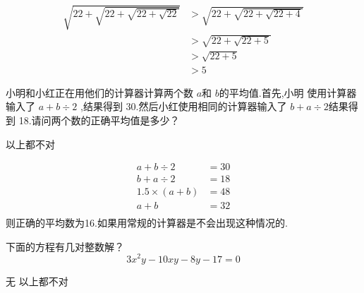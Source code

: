 \documentclass[answers]{exam}
\begin{document}
\begin{questions}
	\begin{oneparchoices}
		    
	\end{oneparchoices}
	\begin{solution}
		\begin{align*}
			\sqrt{22 + \sqrt{22 + \sqrt{22 + \sqrt{22}}}} & > \sqrt{22 + \sqrt{22 + \sqrt{22 + 4}}} \\
			                                              & > \sqrt{22 + \sqrt{22 + 5}}             \\
			                                              & > \sqrt{22 + 5}                         \\
			                                              & > 5
		\end{align*}
	\end{solution}

	\question 小明和小红正在用他们的计算器计算两个数 \( a \)和 \( b \)的平均值.首先,小明 使用计算器输入了 \( a + b
	\div 2 \) ,结果得到 \( 30 \).然后小红使用相同的计算器输入了 \( b + a \div 2 \)结果得到 18.请问两个数的正确平均值是多少？

	\begin{oneparchoices}
		    \choice 以上都不对
	\end{oneparchoices}

	\begin{solution}
		\begin{align*}
			a    + b \div 2   & = 30 \\
			b    + a \div 2   & = 18 \\
			1.5  \times (a+b) & = 48 \\
			a    + b          & = 32 \\
		\end{align*}
		则正确的平均数为16.如果用常规的计算器是不会出现这种情况的.
	\end{solution}

	\question 下面的方程有几对整数解？
	\begin{equation}
		3x^2y - 10xy - 8y - 17 = 0
	\end{equation}
	\begin{oneparchoices}
		\choice 无    \choice 以上都不对
	\end{oneparchoices}


\end{questions}
\end{document}
